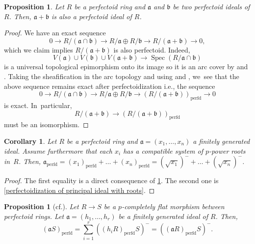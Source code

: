 \documentclass[11pt]{article}
\newcommand{\ie}{i.e.,\xspace}
\newcommand{\cf}{cf.\xspace}
\let\autoref\cref
\theoremstyle{plain}
\newtheorem{corollary}[theorem]{Corollary}
\newtheorem{proposition}[theorem]{Proposition}
\theoremstyle{definition}
\numberwithin{equation}{theorem}
\newcommand{\fra}{\mathfrak{a}}
\newcommand{\frab}{\mathfrak{b}}
\newcommand{\perfd}{_{\mathrm{perfd}}}
\DeclareMathOperator{\Spec}{{Spec}}
\begin{document}
\begin{proposition}\label{finite sum of perfectoid ideals is perfectoid}
Let $R$ be a perfectoid ring and $\fra$ and $\frab$ be two perfectoid ideals of $R$. Then, $\fra+\frab$ is also a perfectoid ideal of $R$.
\end{proposition}

\begin{proof}
We have an exact sequence
\begin{equation}\label{intersection sum exact sequence}
0\to R/\left(\fra\cap \frab\right) \to R/\fra \oplus R/\frab \to R/\left(\fra + \frab\right)\to 0,
\end{equation}
which we claim implies $R/\left(\fra + \frab\right)$ is also perfectoid. Indeed,
\[
V\left(\fra\right)\cup V\left(\frab\right)\cup V\left(\fra+\frab\right) \to \Spec\left(R/\fra\cap \frab\right)
\]
is a universal topological epimorphism onto its image so it is an arc cover by \cite[Prop.\,2.6]{BhattMathewArcTop} and \cite[Th.\,2.8]{RydhSubmersionsEffectiveDescent}.
Taking the sheafification in the arc topology and using \cite[Cor.\,8.11]{BhattScholzePrisms} and \cite[Th.\,2.9]{BhattScholzeProjectivityWittGrassmannian}, we~see that the above sequence remains exact after perfectoidization \ie the sequence
\[
0\to R/\left(\fra\cap \frab\right) \to R/\fra \oplus R/\frab \to \left(R/\left(\fra + \frab\right)\right)\perfd \to 0
\]
is exact. In~particular,
\[
R/\left(\fra + \frab\right) \to \left(R/\left(\fra + \frab\right)\right)\perfd
\]
must be an isomorphism.
\end{proof}

\begin{corollary}\label{perfectoidization is sum of perfectoidizations}
Let $R$ be a perfectoid ring and $\fra=(x_1,\ldots,x_n)$ a finitely generated ideal. Assume furthermore that each $x_i$ has a compatible system of $p$-power roots in~$R$. Then, $\fra\perfd=(x_1)\perfd+\ldots+(x_n)\perfd=(\sqrt{x_1})^{-}+\ldots + (\sqrt{x_n})^{-}$.
\end{corollary}

\begin{proof}
The first equality is a direct consequence of \autoref{finite sum of perfectoid ideals is perfectoid}. The second one is \autoref{perfectoidization of principal ideal with roots}.
\end{proof}

\begin{proposition}[{\cf \cite[Lem.\,2.4.3]{CaiLeeMaSchwedeTuckerPerfectoidSignature}}]
\label{perfectoid ideal under pcflat extension of pfd rings}
Let $R \to S$ be a $p$-completely flat morphism between perfectoid rings. Let $\fra=(h_1,\ldots,h_r)$ be a finitely generated ideal of $R$.
Then,
\[
(\fra S)\perfd=\sum_{i=1}^r \left((h_i R)\perfd S \right)^{-}=((\fra R)\perfd S)^-.
\]
\end{proposition}
\end{document}
